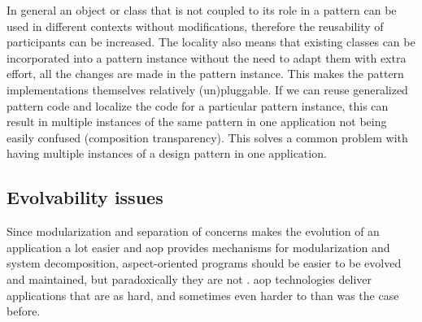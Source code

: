 
In general an object or class that is not coupled to its role in a pattern can be used in different contexts without modifications, therefore the reusability of participants can be increased. 
The locality also means that existing classes can be incorporated into a pattern instance without the need to adapt them with extra effort, all the changes are made in the pattern instance. 
This makes the pattern implementations themselves relatively (un)pluggable. 
If we can reuse generalized pattern code and localize the code for a particular pattern instance, this can result in multiple instances of the same pattern in one application  not being easily confused (composition transparency). This solves a common problem with having multiple instances of a design pattern in one application.

\subsection{Evolvability issues}\label{Aspect Oriented Programming Evolvability}
Since modularization and separation of concerns makes the evolution of an application a lot easier and \ac{aop} provides mechanisms for modularization and system decomposition, aspect-oriented programs should be easier to be evolved and maintained, but paradoxically they are not \cite{tourwe2003existence}. \ac{aop} technologies deliver applications that are as hard, and sometimes even harder to than was the case before.

